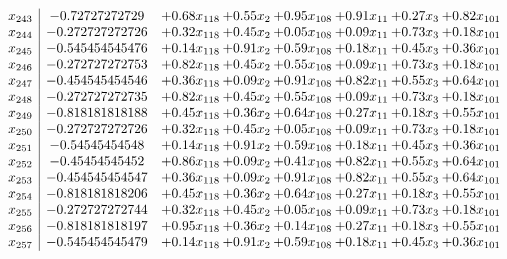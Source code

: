 \documentclass[8pt]{article}
\begin{document}
\[\begin{array}{c| c c@{\hskip 2pt} c@{\hskip 2pt} c@{\hskip 2pt} c@{\hskip 2pt} c@{\hskip 2pt} c@{\hskip 2pt} }
 x_{243}   &  -0.72727272729 & +  0.68 x_{118} & +  0.55 x_{2} & +  0.95 x_{108} & +  0.91 x_{11} & +  0.27 x_{3} & +  0.82 x_{101}\\
 x_{244}   &  -0.272727272726 & +  0.32 x_{118} & +  0.45 x_{2} & +  0.05 x_{108} & +  0.09 x_{11} & +  0.73 x_{3} & +  0.18 x_{101}\\
 x_{245}   &  -0.545454545476 & +  0.14 x_{118} & +  0.91 x_{2} & +  0.59 x_{108} & +  0.18 x_{11} & +  0.45 x_{3} & +  0.36 x_{101}\\
 x_{246}   &  -0.272727272753 & +  0.82 x_{118} & +  0.45 x_{2} & +  0.55 x_{108} & +  0.09 x_{11} & +  0.73 x_{3} & +  0.18 x_{101}\\
 x_{247}   &  -0.454545454546 & +  0.36 x_{118} & +  0.09 x_{2} & +  0.91 x_{108} & +  0.82 x_{11} & +  0.55 x_{3} & +  0.64 x_{101}\\
 x_{248}   &  -0.272727272735 & +  0.82 x_{118} & +  0.45 x_{2} & +  0.55 x_{108} & +  0.09 x_{11} & +  0.73 x_{3} & +  0.18 x_{101}\\
 x_{249}   &  -0.818181818188 & +  0.45 x_{118} & +  0.36 x_{2} & +  0.64 x_{108} & +  0.27 x_{11} & +  0.18 x_{3} & +  0.55 x_{101}\\
 x_{250}   &  -0.272727272726 & +  0.32 x_{118} & +  0.45 x_{2} & +  0.05 x_{108} & +  0.09 x_{11} & +  0.73 x_{3} & +  0.18 x_{101}\\
 x_{251}   &  -0.54545454548 & +  0.14 x_{118} & +  0.91 x_{2} & +  0.59 x_{108} & +  0.18 x_{11} & +  0.45 x_{3} & +  0.36 x_{101}\\
 x_{252}   &  -0.45454545452 & +  0.86 x_{118} & +  0.09 x_{2} & +  0.41 x_{108} & +  0.82 x_{11} & +  0.55 x_{3} & +  0.64 x_{101}\\
 x_{253}   &  -0.454545454547 & +  0.36 x_{118} & +  0.09 x_{2} & +  0.91 x_{108} & +  0.82 x_{11} & +  0.55 x_{3} & +  0.64 x_{101}\\
 x_{254}   &  -0.818181818206 & +  0.45 x_{118} & +  0.36 x_{2} & +  0.64 x_{108} & +  0.27 x_{11} & +  0.18 x_{3} & +  0.55 x_{101}\\
 x_{255}   &  -0.272727272744 & +  0.32 x_{118} & +  0.45 x_{2} & +  0.05 x_{108} & +  0.09 x_{11} & +  0.73 x_{3} & +  0.18 x_{101}\\
 x_{256}   &  -0.818181818197 & +  0.95 x_{118} & +  0.36 x_{2} & +  0.14 x_{108} & +  0.27 x_{11} & +  0.18 x_{3} & +  0.55 x_{101}\\
 x_{257}   &  -0.545454545479 & +  0.14 x_{118} & +  0.91 x_{2} & +  0.59 x_{108} & +  0.18 x_{11} & +  0.45 x_{3} & +  0.36 x_{101}\\

\end{array}\]
\end{document}
